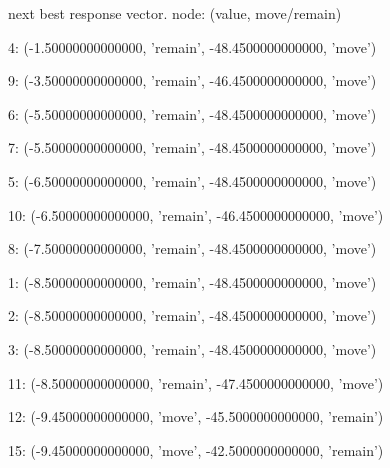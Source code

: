 \begin{figure}[h!]
\end{figure}
\clearpage \pagebreak


 next best response vector.  node: (value, move/remain)


4: (-1.50000000000000, 'remain', -48.4500000000000, 'move')


9: (-3.50000000000000, 'remain', -46.4500000000000, 'move')


6: (-5.50000000000000, 'remain', -48.4500000000000, 'move')


7: (-5.50000000000000, 'remain', -48.4500000000000, 'move')


5: (-6.50000000000000, 'remain', -48.4500000000000, 'move')


10: (-6.50000000000000, 'remain', -46.4500000000000, 'move')


8: (-7.50000000000000, 'remain', -48.4500000000000, 'move')


1: (-8.50000000000000, 'remain', -48.4500000000000, 'move')


2: (-8.50000000000000, 'remain', -48.4500000000000, 'move')


3: (-8.50000000000000, 'remain', -48.4500000000000, 'move')


11: (-8.50000000000000, 'remain', -47.4500000000000, 'move')


12: (-9.45000000000000, 'move', -45.5000000000000, 'remain')


15: (-9.45000000000000, 'move', -42.5000000000000, 'remain')



